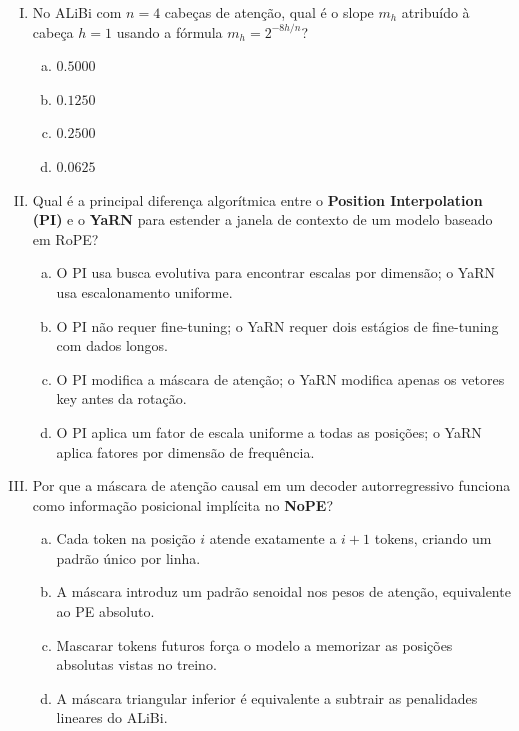 \documentclass{dlproblemset}
\begin{document}
\begin{enumerate}[I)]
\item No ALiBi com $n = 4$ cabeças de atenção, qual é o slope $m_h$ atribuído à
      cabeça $h = 1$ usando a fórmula $m_h = 2^{-8h/n}$?

\begin{enumerate}[a)]
    \item $0.5000$
    \item $0.1250$
    \item $0.2500$
    \item $0.0625$
\end{enumerate}

\item Qual é a principal diferença algorítmica entre o
      \textbf{Position Interpolation (PI)} e o \textbf{YaRN}
      para estender a janela de contexto de um modelo baseado em RoPE?

\begin{enumerate}[a)]
    \item O PI usa busca evolutiva para encontrar escalas por dimensão; o YaRN usa
          escalonamento uniforme.
    \item O PI não requer fine-tuning; o YaRN requer dois estágios de fine-tuning
          com dados longos.
    \item O PI modifica a máscara de atenção; o YaRN modifica apenas os vetores
          key antes da rotação.
    \item O PI aplica um fator de escala uniforme a todas as posições; o YaRN
          aplica fatores por dimensão de frequência.
\end{enumerate}

\item Por que a máscara de atenção causal em um decoder autorregressivo funciona como
      informação posicional implícita no \textbf{NoPE}?

\begin{enumerate}[a)]
    \item Cada token na posição $i$ atende exatamente a $i+1$ tokens, criando um
          padrão único por linha.
    \item A máscara introduz um padrão senoidal nos pesos de atenção, equivalente
          ao PE absoluto.
    \item Mascarar tokens futuros força o modelo a memorizar as posições absolutas
          vistas no treino.
    \item A máscara triangular inferior é equivalente a subtrair as penalidades
          lineares do ALiBi.
\end{enumerate}


\end{enumerate}
\end{document}
